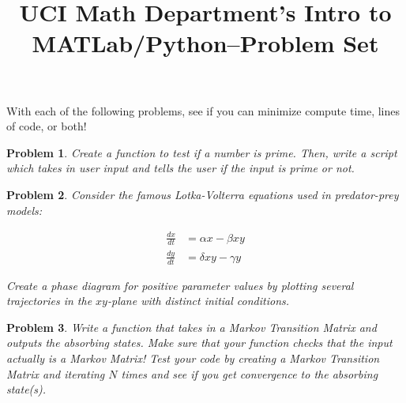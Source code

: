 \documentclass{article}
\newtheorem{problem}{Problem}
\begin{document}
\title{UCI Math Department's Intro to MATLab/Python--Problem Set}
\maketitle

With each of the following problems, see if you can minimize compute time, lines of code, or both!

\begin{problem}
Create a function to test if a number is prime. Then, write a script which takes in user input and tells the user if the input is prime or not.
\end{problem}

\begin{problem}
Consider the famous Lotka-Volterra equations used in predator-prey models:

\begin{align*}
\frac{dx}{dt} & = \alpha x - \beta xy \\
\frac{dy}{dt} & = \delta xy - \gamma y
\end{align*}

Create a phase diagram for positive parameter values by plotting several trajectories in the $xy$-plane with distinct initial conditions.

\end{problem}

\begin{problem}

Write a function that takes in a Markov Transition Matrix and outputs the absorbing states.
Make sure that your function checks that the input actually is a Markov Matrix!
Test your code by creating a Markov Transition Matrix and iterating $N$ times and see if you get convergence to the absorbing state(s).

\end{problem}
\end{document}
